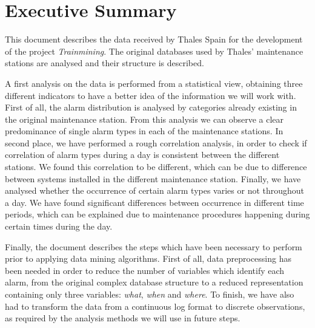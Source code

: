 \documentclass[a4paper,12pt]{article}
\begin{document}
\newcommand\litem[1]{\item{\bfseries #1 }}
\renewcommand{\arraystretch}{1.5} %

\newcommand\headcell[1]{%
  \multicolumn{1}{c|}{\cellcolor{MidnightBlue}\bfseries\sffamily\textcolor{white}{#1}}
}

%

\onehalfspacing



\section*{Executive Summary}

This document describes the data received by Thales Spain for the development of the project \emph{Trainmining}. The original databases used by Thales' maintenance stations are analysed and their structure is described.

A first analysis on the data is performed from a statistical view, obtaining three different indicators to have a better idea of the information we will work with. First of all, the alarm distribution is analysed by categories already existing in the original maintenance station. From this analysis we can observe a clear predominance of single alarm types in each of the maintenance stations. In second place, we have performed a rough correlation analysis, in order to check if correlation of alarm types during a day is consistent between the different stations. We found this correlation to be different, which can be due to difference between systems installed in the different maintenance station. Finally, we have analysed whether the occurrence of certain alarm types varies or not throughout a day. We have found significant differences between occurrence in different time periods, which can be explained due to maintenance procedures happening during certain times during the day.

Finally, the document describes the steps which have been necessary to perform prior to applying data mining algorithms. First of all, data preprocessing has been needed in order to reduce the number of variables which identify each alarm, from the original complex database structure to a reduced representation containing only three variables: \emph{what}, \emph{when} and \emph{where}. To finish, we have also had to transform the data from a continuous log format to discrete observations, as required by the analysis methods we will use in future steps.
\end{document}
